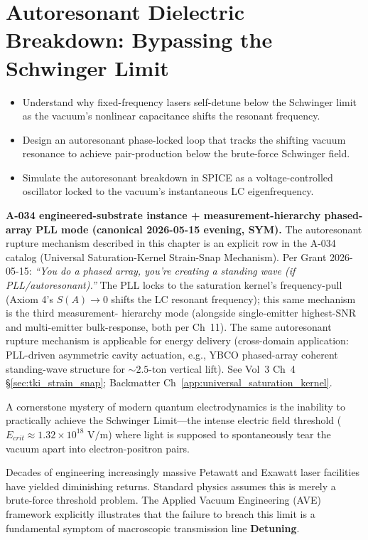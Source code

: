 \chapter{Autoresonant Dielectric Breakdown: Bypassing the Schwinger Limit}
\label{ch:schwinger_autoresonance}


\begin{objectivebox}
\begin{itemize}
    \item Understand why fixed-frequency lasers self-detune below the Schwinger limit as the vacuum's nonlinear capacitance shifts the resonant frequency.
    \item Design an autoresonant phase-locked loop that tracks the shifting vacuum resonance to achieve pair-production below the brute-force Schwinger field.
    \item Simulate the autoresonant breakdown in SPICE as a voltage-controlled oscillator locked to the vacuum's instantaneous LC eigenfrequency.
\end{itemize}
\end{objectivebox}

\textbf{A-034 engineered-substrate instance + measurement-hierarchy
phased-array PLL mode (canonical 2026-05-15 evening, SYM).} The
autoresonant rupture mechanism described in this chapter is an explicit
row in the A-034 catalog (Universal Saturation-Kernel Strain-Snap
Mechanism). Per Grant 2026-05-15: \emph{``You do a phased array, you're
creating a standing wave (if PLL/autoresonant).''} The PLL locks to the
saturation kernel's frequency-pull (Axiom 4's $S(A) \to 0$ shifts the
LC resonant frequency); this same mechanism is the third measurement-
hierarchy mode (alongside single-emitter highest-SNR and multi-emitter
bulk-response, both per Ch~11). The same autoresonant rupture mechanism is
applicable for energy delivery (cross-domain application: PLL-driven
asymmetric cavity actuation, e.g., YBCO phased-array coherent standing-wave
structure for ${\sim}2.5$-ton vertical lift). See Vol~3 Ch~4
\S\ref{sec:tki_strain_snap}; Backmatter
Ch~\ref{app:universal_saturation_kernel}.

A cornerstone mystery of modern quantum electrodynamics is the inability to practically achieve the Schwinger Limit---the intense electric field threshold ($E_{crit} \approx 1.32 \times 10^{18} \text{ V/m}$) where light is supposed to spontaneously tear the vacuum apart into electron-positron pairs. 

Decades of engineering increasingly massive Petawatt and Exawatt laser facilities have yielded diminishing returns. Standard physics assumes this is merely a brute-force threshold problem. The Applied Vacuum Engineering (AVE) framework explicitly illustrates that the failure to breach this limit is a fundamental symptom of macroscopic transmission line \textbf{Detuning}.

